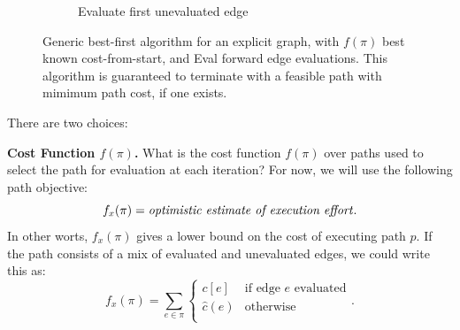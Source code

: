 \documentclass{report}
\begin{document}
\begin{figure}
\begin{subfigure}[b]{0.45\textwidth}
\caption{Evaluate first unevaluated edge}
\end{subfigure}%
\caption{Generic best-first algorithm for an explicit graph,
   with $f(\pi)$ best known cost-from-start,
   and {\sc Eval} forward edge evaluations.
   This algorithm is guaranteed to terminate with a feasible path
   with mimimum path cost, if one exists.}
\label{fig:seg-edge-example}
\end{figure}

There are two choices:

\textbf{Cost Function $f(\pi)$.}
What is the cost function $f(\pi)$ over paths used to select the
path for evaluation at each iteration?
For now, we will use the following path objective:
\begin{equation}
   f_x(\pi) = \mbox{\emph{optimistic estimate of execution effort}}.
\end{equation}
In other worts, $f_x(\pi)$ gives a lower bound on the cost of executing
path $p$.
If the path consists of a mix of evaluated and unevaluated edges,
we could write this as:
\begin{equation}
   f_x(\pi) = \sum_{e \in \pi} \left\{
   \begin{array}{cl}
      c[e] & \mbox{if edge } e \mbox{ evaluated}  \\
      \hat{c}(e) & \mbox{otherwise} \\
   \end{array}
   \right.
   .
   \label{eqn:execution-cost-objective}
\end{equation}
\end{document}
